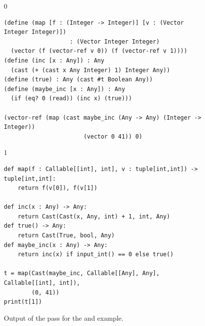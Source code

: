 \documentclass[7x10]{TimesAPriori_MIT}%
\def\racketEd{0}
\def\pythonEd{1}
\def\edition{0}
\numberwithin{theorem}{chapter}
\numberwithin{definition}{chapter}
\numberwithin{equation}{chapter}
\begin{document}
\begin{figure}[btp]
  \begin{tcolorbox}[colback=white]
{\if\edition\racketEd        
\begin{lstlisting}[basicstyle=\ttfamily\footnotesize]
(define (map [f : (Integer -> Integer)] [v : (Vector Integer Integer)])
                   : (Vector Integer Integer)
  (vector (f (vector-ref v 0)) (f (vector-ref v 1))))
(define (inc [x : Any]) : Any
  (cast (+ (cast x Any Integer) 1) Integer Any))
(define (true) : Any (cast #t Boolean Any))
(define (maybe_inc [x : Any]) : Any
  (if (eq? 0 (read)) (inc x) (true)))

(vector-ref (map (cast maybe_inc (Any -> Any) (Integer -> Integer))
                       (vector 0 41)) 0)
\end{lstlisting}
\fi}
{\if\edition\pythonEd        
\begin{lstlisting}[basicstyle=\ttfamily\footnotesize]
def map(f : Callable[[int], int], v : tuple[int,int]) -> tuple[int,int]:
    return f(v[0]), f(v[1])

def inc(x : Any) -> Any:
    return Cast(Cast(x, Any, int) + 1, int, Any)
def true() -> Any:
    return Cast(True, bool, Any)
def maybe_inc(x : Any) -> Any:
    return inc(x) if input_int() == 0 else true()

t = map(Cast(maybe_inc, Callable[[Any], Any], Callable[[int], int]),
        (0, 41))
print(t[1])
\end{lstlisting}
\fi}
\end{tcolorbox}

\caption{Output of the  pass for the 
  and  example.}
\label{fig:map-cast}
\end{figure}
\end{document}
